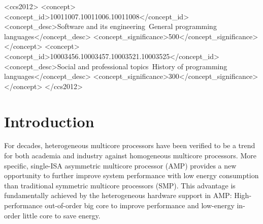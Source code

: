 \documentclass[sigplan,review,anonymous]{acmart}\settopmatter{printfolios=true,printccs=false,printacmref=false}
\begin{document}


\begin{CCSXML}
<ccs2012>
<concept>
<concept_id>10011007.10011006.10011008</concept_id>
<concept_desc>Software and its engineering~General programming languages</concept_desc>
<concept_significance>500</concept_significance>
</concept>
<concept>
<concept_id>10003456.10003457.10003521.10003525</concept_id>
<concept_desc>Social and professional topics~History of programming languages</concept_desc>
<concept_significance>300</concept_significance>
</concept>
</ccs2012>
\end{CCSXML}





\maketitle

\section{Introduction}
\label{itr}
For decades, heterogeneous multicore processors have been verified to be a trend for both academia and industry against homogeneous multicore processors. More specific, single-ISA asymmetric multicore processor (AMP) provides a new opportunity to further improve system performance with low energy consumption than traditional symmetric multicore processors (SMP).  This advantage is fundamentally achieved by the heterogeneous hardware support in AMP: High-performance out-of-order big core to improve performance and low-energy in-order little core to save energy.  
\end{document}
